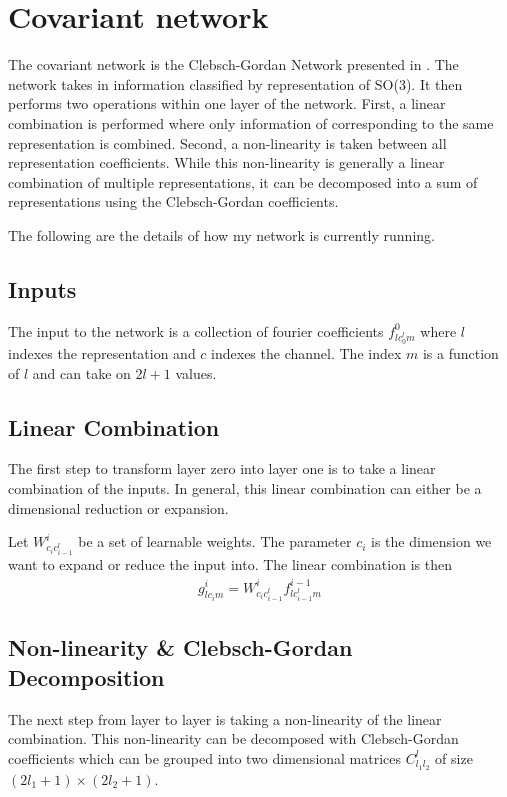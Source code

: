 \documentclass{article}
\begin{document}
\section{Covariant network}
The covariant network is the Clebsch-Gordan Network presented in \cite{CG Net}. The network takes in information classified by representation of SO(3). It then performs two operations within one layer of the network. First, a linear combination is performed where only information of corresponding to the same representation is combined. Second, a non-linearity is taken between all representation coefficients. While this non-linearity is generally a linear combination of multiple representations, it can be decomposed into a sum of representations using the Clebsch-Gordan coefficients.

The following are the details of how my network is currently running.


\subsection{Inputs}
The input to the network is a collection of fourier coefficients $f^0_{lc^l_0m}$ where $l$ indexes the representation and $c$ indexes the channel. The index $m$ is a function of $l$ and can take on $2l+1$ values.

\subsection{Linear Combination}
The first step to transform layer zero into layer one is to take a linear combination of the inputs. In general, this linear combination can either be a dimensional reduction or expansion. 

Let $W^i_{c_{i}c^l_{i-1}}$ be a set of learnable weights. The parameter $c_i$ is the dimension we want to expand or reduce the input into. The linear combination is then
\begin{align}
    g^{i}_{lc_{i}m} = W^i_{c_{i}c^l_{i-1}}f^{i-1}_{lc^l_{i-1}m} 
\end{align}

\subsection{Non-linearity & Clebsch-Gordan Decomposition}
The next step from layer to layer is taking a non-linearity of the linear combination. This non-linearity can be decomposed with Clebsch-Gordan coefficients which can be grouped into two dimensional matrices $C^l_{l_1 l_2}$ of size $(2l_1+1)\times(2l_2+1)$.
\end{document}
